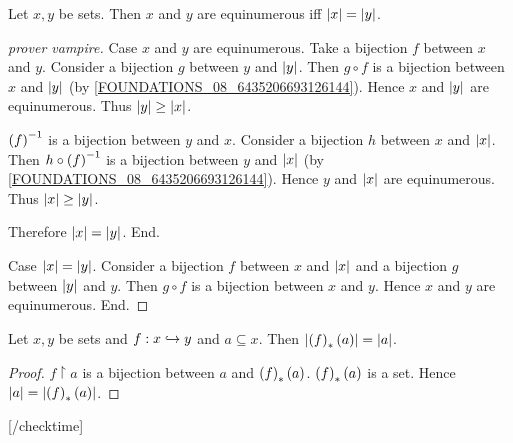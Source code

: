 \documentclass[../set-theory.tex]{subfiles}
\begin{document}
  \begin{forthel}
    \begin{proposition}
      Let $x, y$ be sets.
      Then $x$ and $y$ are equinumerous iff $\left\vert x\right\vert = \left\vert y\right\vert$.
    \end{proposition}
    \begin{proof}
      [prover vampire]

      Case $x$ and $y$ are equinumerous.
        Take a bijection $f$ between $x$ and $y$.
        Consider a bijection $g$ between $y$ and $\left\vert y\right\vert$.
        Then $g \circ f$ is a bijection between $x$ and $\left\vert y\right\vert$
        (by \cref{FOUNDATIONS_08_6435206693126144}).
        Hence $x$ and $\left\vert y\right\vert$ are equinumerous.
        Thus $\left\vert y\right\vert \geq \left\vert x\right\vert$.

        $\left(f\right)^{-1}$ is a bijection between $y$ and $x$.
        Consider a bijection $h$ between $x$ and $\left\vert x\right\vert$.
        Then $h \circ \left(f\right)^{-1}$ is a bijection between $y$ and $\left\vert x\right\vert$
        (by \cref{FOUNDATIONS_08_6435206693126144}).
        Hence $y$ and $\left\vert x\right\vert$ are equinumerous.
        Thus $\left\vert x\right\vert \geq \left\vert y\right\vert$.

        Therefore $\left\vert x\right\vert = \left\vert y\right\vert$.
      End.

      Case $\left\vert x\right\vert = \left\vert y\right\vert$.
        Consider a bijection $f$ between $x$ and $\left\vert x\right\vert$ and a bijection $g$
        between $\left\vert y\right\vert$ and $y$.
        Then $g \circ f$ is a bijection between $x$ and $y$.
        Hence $x$ and $y$ are equinumerous.
      End.
    \end{proof}
  \end{forthel}

  \begin{forthel}
    [checktime 2]

    \begin{proposition}
      Let $x, y$ be sets and $f : x \hookrightarrow y$ and $a \subseteq x$.
      Then $\left\vert\left(f\right)_{*}(a)\right\vert = \left\vert a\right\vert$.
    \end{proposition}
    \begin{proof}
      $f \restriction a$ is a bijection between $a$ and $\left(f\right)_{*}(a)$.
      $\left(f\right)_{*}(a)$ is a set.
      Hence $\left\vert a\right\vert = \left\vert\left(f\right)_{*}(a)\right\vert$.
    \end{proof}

    [/checktime]
  \end{forthel}
\end{document}
